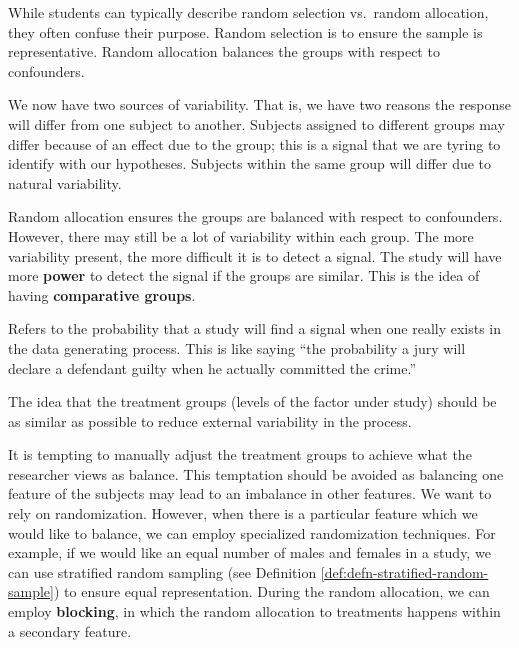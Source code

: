 \documentclass[]{book}
\theoremstyle{definition}
\theoremstyle{definition}
\theoremstyle{definition}
\theoremstyle{remark}
\let\BeginKnitrBlock\begin \let\EndKnitrBlock\end
\begin{document}
\BeginKnitrBlock{rmdtip}
While students can typically describe random selection vs.~random
allocation, they often confuse their purpose. Random selection is to
ensure the sample is representative. Random allocation balances the
groups with respect to confounders.
\EndKnitrBlock{rmdtip}

We now have two sources of variability. That is, we have two reasons the
response will differ from one subject to another. Subjects assigned to
different groups may differ because of an effect due to the group; this
is a signal that we are tyring to identify with our hypotheses. Subjects
within the same group will differ due to natural variability.

Random allocation ensures the groups are balanced with respect to
confounders. However, there may still be a lot of variability within
each group. The more variability present, the more difficult it is to
detect a signal. The study will have more \textbf{power} to detect the
signal if the groups are similar. This is the idea of having
\textbf{comparative groups}.

\BeginKnitrBlock{definition}[Power]
\protect\hypertarget{def:defn-power}{}{\label{def:defn-power}
{} }Refers to the probability that a study will find
a signal when one really exists in the data generating process. This is
like saying ``the probability a jury will declare a defendant guilty
when he actually committed the crime.''
\EndKnitrBlock{definition}

\BeginKnitrBlock{definition}[Comparative Groups]
\protect\hypertarget{def:defn-comparative-groups}{}{\label{def:defn-comparative-groups}
{} }The idea that the treatment groups
(levels of the factor under study) should be as similar as possible to
reduce external variability in the process.
\EndKnitrBlock{definition}

It is tempting to manually adjust the treatment groups to achieve what
the researcher views as balance. This temptation should be avoided as
balancing one feature of the subjects may lead to an imbalance in other
features. We want to rely on randomization. However, when there is a
particular feature which we would like to balance, we can employ
specialized randomization techniques. For example, if we would like an
equal number of males and females in a study, we can use stratified
random sampling (see Definition \ref{def:defn-stratified-random-sample})
to ensure equal representation. During the random allocation, we can
employ \textbf{blocking}, in which the random allocation to treatments
happens within a secondary feature.
\end{document}
